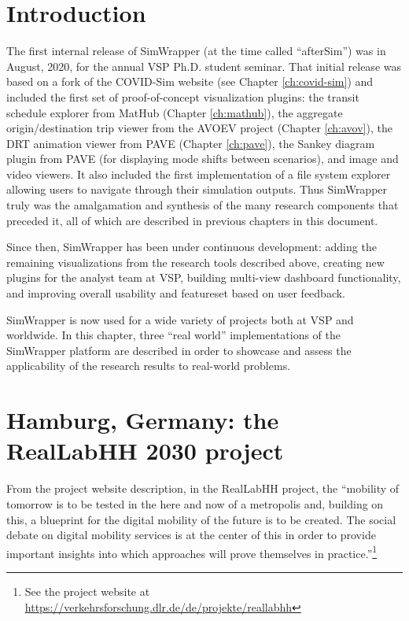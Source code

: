 \section{Introduction}
\label{sites-intro}

The first internal release of SimWrapper (at the time called ``afterSim'') was in August, 2020, for the annual VSP Ph.D. student seminar. That initial release was based on a fork of the COVID-Sim website (see Chapter \ref{ch:covid-sim}) and included the first set of proof-of-concept visualization plugins: the transit schedule explorer from MatHub (Chapter \ref{ch:mathub}), the aggregate origin/destination trip viewer from the AVOEV project (Chapter \ref{ch:avov}), the \gls{DRT} animation viewer from PAVE (Chapter \ref{ch:pave}), the Sankey diagram plugin from PAVE (for displaying mode shifts between scenarios), and image and video viewers. It also included the first implementation of a file system explorer allowing users to navigate through their simulation outputs. Thus SimWrapper truly was the amalgamation and synthesis of the many research components that preceded it, all of which are described in previous chapters in this document.

Since then, SimWrapper has been under continuous development: adding the remaining visualizations from the research tools described above, creating new plugins for the analyst team at VSP, building multi-view dashboard functionality, and improving overall usability and featureset based on user feedback.

SimWrapper is now used for a wide variety of projects both at VSP and worldwide. In this chapter, three ``real world'' implementations of the SimWrapper platform are described in order to showcase and assess the applicability of the research results to real-world problems.

\section{Hamburg, Germany: the RealLabHH 2030 project}
\label{sites-hamburg}

From the project website description, in the RealLabHH project, the ``mobility of tomorrow is to be tested in the here and now of a metropolis and, building on this, a blueprint for the digital mobility of the future is to be created. The social debate on digital mobility services is at the center of this in order to provide important insights into which approaches will prove themselves in practice.''\footnote{See the project website at \url{https://verkehrsforschung.dlr.de/de/projekte/reallabhh}}

